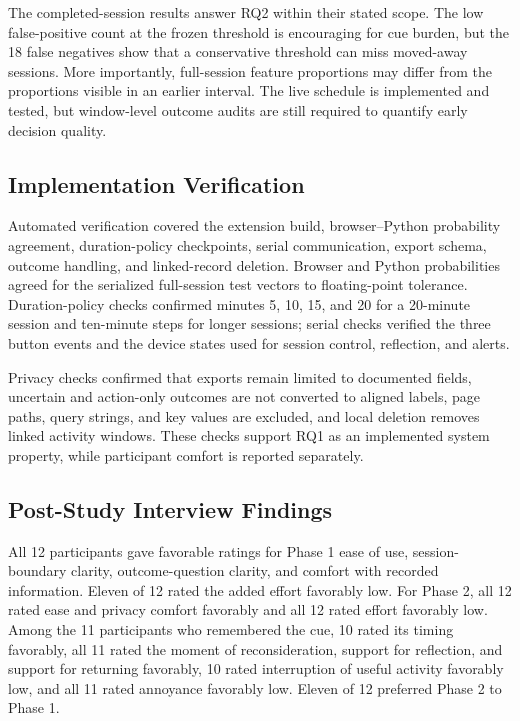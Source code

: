 \documentclass[12pt,a4paper]{article}
\begin{document}
The completed-session results answer RQ2 within their stated scope. The low false-positive count at the frozen threshold is encouraging for cue burden, but the 18 false negatives show that a conservative threshold can miss moved-away sessions. More importantly, full-session feature proportions may differ from the proportions visible in an earlier interval. The live schedule is implemented and tested, but window-level outcome audits are still required to quantify early decision quality.

\subsection{Implementation Verification}

Automated verification covered the extension build, browser--Python probability agreement, duration-policy checkpoints, serial communication, export schema, outcome handling, and linked-record deletion. Browser and Python probabilities agreed for the serialized full-session test vectors to floating-point tolerance. Duration-policy checks confirmed minutes 5, 10, 15, and 20 for a 20-minute session and ten-minute steps for longer sessions; serial checks verified the three button events and the device states used for session control, reflection, and alerts.

Privacy checks confirmed that exports remain limited to documented fields, uncertain and action-only outcomes are not converted to aligned labels, page paths, query strings, and key values are excluded, and local deletion removes linked activity windows. These checks support RQ1 as an implemented system property, while participant comfort is reported separately.

\subsection{Post-Study Interview Findings}

All 12 participants gave favorable ratings for Phase 1 ease of use, session-boundary clarity, outcome-question clarity, and comfort with recorded information. Eleven of 12 rated the added effort favorably low. For Phase 2, all 12 rated ease and privacy comfort favorably and all 12 rated effort favorably low. Among the 11 participants who remembered the cue, 10 rated its timing favorably, all 11 rated the moment of reconsideration, support for reflection, and support for returning favorably, 10 rated interruption of useful activity favorably low, and all 11 rated annoyance favorably low. Eleven of 12 preferred Phase 2 to Phase 1.
\end{document}
